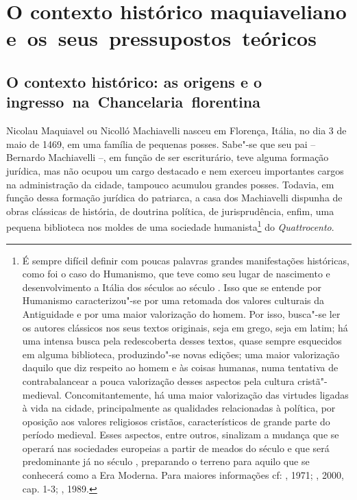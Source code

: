 \section{O contexto histórico maquiaveliano e~os~seus~pressupostos~teóricos}

\subsection{O contexto histórico: as origens e o ingresso~na~Chancelaria~florentina}

Nicolau Maquiavel ou Nicolló Machiavelli nasceu em Florença, Itália, no
dia 3 de maio de 1469, em uma família de pequenas posses. Sabe"-se que
seu pai -- Bernardo Machiavelli --, em função de ser escriturário, teve
alguma formação jurídica, mas não ocupou um cargo destacado e nem
exerceu importantes cargos na administração da cidade, tampouco acumulou
grandes posses. Todavia, em função dessa formação jurídica do patriarca,
a casa dos Machiavelli dispunha de obras clássicas de história, de
doutrina política, de jurisprudência, enfim, uma pequena biblioteca nos
moldes de uma sociedade humanista\footnote{É sempre difícil definir com
  poucas palavras grandes manifestações históricas, como foi o caso do
  Humanismo, que teve como seu lugar de nascimento e desenvolvimento a
  Itália dos séculos  ao século . Isso que se entende por
  Humanismo caracterizou"-se por uma retomada dos valores culturais da
  Antiguidade e por uma maior valorização do homem. Por isso, busca"-se
  ler os autores clássicos nos seus textos originais, seja em grego,
  seja em latim; há uma intensa busca pela redescoberta desses textos,
  quase sempre esquecidos em alguma biblioteca, produzindo"-se novas
  edições; uma maior valorização daquilo que diz respeito ao homem e às
  coisas humanas, numa tentativa de contrabalancear a pouca valorização
  desses aspectos pela cultura cristã"-medieval. Concomitantemente, há
  uma maior valorização das virtudes ligadas à vida na cidade,
  principalmente as qualidades relacionadas à política, por oposição aos
  valores religiosos cristãos, característicos de grande parte do
  período medieval. Esses aspectos, entre outros, sinalizam a mudança
  que se operará nas sociedades europeias a partir de meados do século
   e que será predominante já no século , preparando o terreno
  para aquilo que se conhecerá como a Era Moderna. Para maiores
  informações cf: , 1971; , 2000, cap. 1-3; , 1989.} do
\emph{Quattrocento}.

